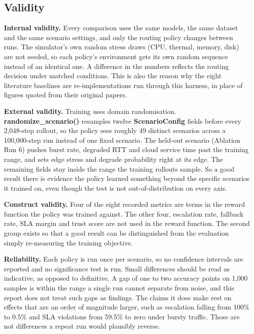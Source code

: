 \hypertarget{validity}{%
\subsection{Validity}\label{validity}}

\textbf{Internal validity.} Every comparison uses the same models, the
same dataset and the same scenario settings, and only the routing
policy changes between runs. The simulator's own random stress draws
(CPU, thermal, memory, disk) are not seeded, so each policy's
environment gets its own random sequence instead of an identical one.
A difference in the numbers reflects the routing decision under
matched conditions. This is also the reason why the eight literature
baselines are re-implementations run through this harness, in place of
figures quoted from their original papers.

\textbf{External validity.} Training uses domain randomisation.
\textbf{randomize\_scenario()} resamples twelve \textbf{ScenarioConfig}
fields before every 2,048-step rollout, so the policy sees roughly 49
distinct scenarios across a 100,000-step run instead of one fixed
scenario. The held-out scenario (Ablation Run 6) pushes burst rate,
degraded RTT and cloud service time past the training range, and sets
edge stress and degrade probability right at its edge. The remaining
fields stay inside the range the training rollouts sample. So a good
result there is evidence the policy learned something beyond the
specific scenarios it trained on, even though the test is not
out-of-distribution on every axis.

\textbf{Construct validity.} Four of the eight recorded metrics are terms
in the reward function the policy was trained against. The other four,
escalation rate, fallback rate, SLA margin and trust score are not used 
in the reward function. The second group exists so that a good result can 
be distinguished from the evaluation simply re-measuring the training objective.

\textbf{Reliability.} Each policy is run once per scenario, so no
confidence intervals are reported and no significance test is run. Small
differences should be read as indicative, as opposed to definitive. A gap
of one to two accuracy points on 1,000 samples is within the range a
single run cannot separate from noise, and this report does not treat
such gaps as findings. The claims it does make rest on effects that are
an order of magnitude larger, such as escalation falling from 100\% to
0.5\% and SLA violations from 59.5\% to zero under bursty traffic. Those
are not differences a repeat run would plausibly reverse.

